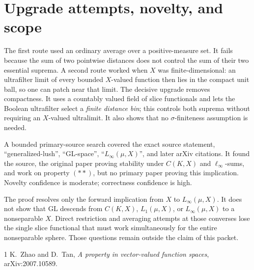 \documentclass[11pt,a4paper]{article}
\begin{document}
\section{Upgrade attempts, novelty, and scope}

The first route used an ordinary average over a positive-measure set.  It
fails because the sum of two pointwise distances does not control the sum of
their two essential suprema.  A second route worked when $X$ was
finite-dimensional: an ultrafilter limit of every bounded $X$-valued
function then lies in the compact unit ball, so one can patch near that
limit.  The decisive upgrade removes compactness.  It uses a countably
valued field of slice functionals and lets the Boolean ultrafilter select a
\emph{finite distance bin}; this controls both suprema without requiring an
$X$-valued ultralimit.  It also shows that no $\sigma$-finiteness assumption
is needed.

A bounded primary-source search covered the exact source statement,
``generalized-lush'', ``GL-space'', ``$L_\infty(\mu,X)$'', and later arXiv
citations.  It found the source, the original paper proving stability under
$C(K,X)$ and $\ell_\infty$-sums, and work on property $(**)$, but no primary
paper proving this implication.  Novelty confidence is moderate; correctness
confidence is high.

The proof resolves only the forward implication from $X$ to
$L_\infty(\mu,X)$.  It does not show that GL descends from $C(K,X)$,
$L_1(\mu,X)$, or $L_\infty(\mu,X)$ to a nonseparable $X$.  Direct restriction
and averaging attempts at those converses lose the single slice functional
that must work simultaneously for the entire nonseparable sphere.  Those
questions remain outside the claim of this packet.

\begin{thebibliography}{1}
K.~Zhao and D.~Tan,
\emph{A property in vector-valued function spaces},
arXiv:2007.10589.
\end{thebibliography}
\end{document}
